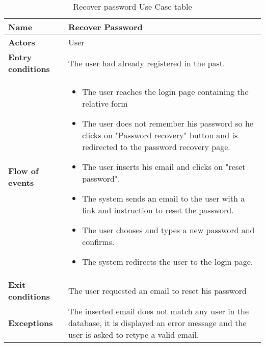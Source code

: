 \begin{table}[!htbp]
	
	\hypertarget{tab:recoverpasswordusecase}{}
	\centering
	\begin{tabular}{lp{8cm}}
		\bf\large Name&\bf\large Recover Password \\
		\hline
		\hline
		\bf Actors&User\\
		\hline
		\bf Entry conditions&The user had already registered in the past.\\
		\hline
		\bf Flow of events&
		\begin{itemize}
			\item The user reaches the login page containing the relative form
			\item The user does not remember his password so he clicks on "Password recovery" button and is redirected to the password recovery page.
			\item The user inserts his email and clicks on "reset password".
			\item The system sends an email to the user with a link and instruction to reset the password.
			\item The user chooses and types a new password and confirms.
			\item The system redirects the user to the login page.
		\end{itemize}
		\\
		\hline
		\bf Exit conditions&The user requested an email to reset his password \\
		\hline
		\bf Exceptions&The inserted email does not match any user in the database, it is displayed an error message and the user is asked to retype a valid email.\\
		\hline
		
	\end{tabular}
	\caption{Recover password Use Case table} \label{tab:recoverpassword}
\end{table}